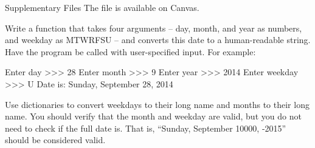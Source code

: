 \documentclass[11pt]{cselabheader}
\begin{document}
\begin{infobox}{Supplementary Files}
The file  is available on Canvas.
\end{infobox}

\begin{ex}[days.py] Write a function that takes four arguments -- day, month, and
    year as numbers, and weekday as MTWRFSU -- and converts this date to a
    human-readable string. Have the program be called with user-specified
    input. For example:

    \begin{verbatimcode}
Enter day >>> 28
Enter month >>> 9
Enter year >>> 2014
Enter weekday >>> U
Date is: Sunday, September 28, 2014
    \end{verbatimcode}

    Use dictionaries to convert weekdays to their long name and months to their
    long name. You should verify that the month and weekday are valid, but you
    do not need to check if the full date is. That is,
    ``Sunday, September 10000, -2015'' should be considered valid.
\end{ex}



%
\end{document}
